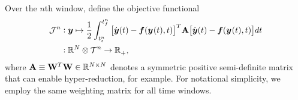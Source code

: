Over the $n$th window, define the objective functional
\begin{equation}\label{eq:obj}
\begin{split} \mathcal{J}^n &\vcentcolon \statey \mapsto
\frac{1}{2} \int_{\timeStartArg{n}}^{\timeEndArg{n}} \big[ \dot{\statey}(t)
- \velocity(\stateyArg{}{t},t) \big]^T \stweightingMatArgt{n}{t} \big[
\dot{\statey}(t) - \velocity(\stateyArg{}{t},t) \big] d t \\
&\vcentcolon \RR{\fomdim}\otimes \timeSpaceArg{n}  \rightarrow
\RR{}_+, 
\end{split}
\end{equation}
where $\stweightingMatArg{n} \equiv \stweightingMatOneArg{ }^T
\stweightingMatOneArg{ } \in \RR{\fomdim \times \fomdim}$ denotes a
symmetric positive semi-definite matrix that can enable hyper-reduction, for
example. For notational simplicity, 
we employ the same weighting matrix for all time windows. 

